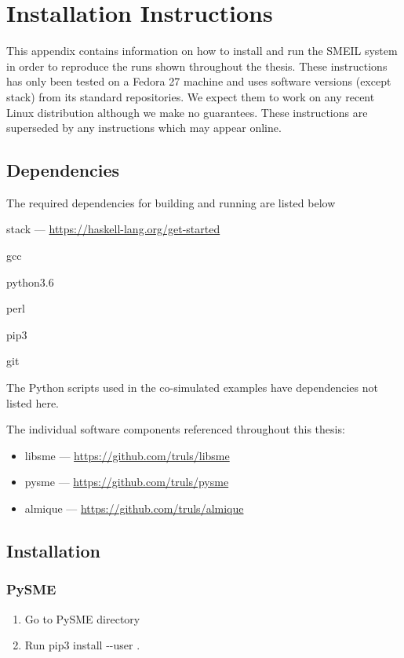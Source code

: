 \chapter{Installation Instructions}
\label{app:inst}

This appendix contains information on how to install and run the SMEIL system in
order to reproduce the runs shown throughout the thesis. These instructions has
only been tested on a Fedora 27 machine and uses software versions (except
stack) from its standard repositories. We expect them to work on any recent
Linux distribution although we make no guarantees. These instructions are
superseded by any instructions which may appear online.



\section{Dependencies}
The required dependencies for building and running are listed below
\begin{itemize}
\item {\ttfamily stack} --- \url{https://haskell-lang.org/get-started}
  {\ttfamily 
\item gcc
\item python3.6
\item perl
\item pip3
\item git}
\item The Python scripts used in the co-simulated examples have dependencies not
  listed here.
\end{itemize}

\noindent The individual software components referenced throughout this thesis:

\begin{itemize}
\item libsme --- \url{https://github.com/truls/libsme}
\item pysme --- \url{https://github.com/truls/pysme}
\item almique --- \url{https://github.com/truls/almique}
\end{itemize}

\section{Installation}
\subsection{PySME}
\begin{enumerate}
\item Go to PySME directory
  \item Run {\ttfamily pip3 install -{}-{}user .}
\end{enumerate}

